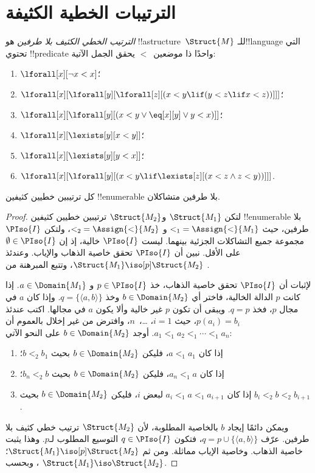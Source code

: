 \documentclass[../../../include/open-logic-section]{subfiles}
\begin{document}
\section{الترتيبات الخطية الكثيفة}

\begin{defn}
  \emph{الترتيب الخطي الكثيف بلا طرفين} هو !!a{structure}~$\Struct{M}$
  للـ!!{language} التي تحتوي !!{predicate} واحدًا ذا موضعين~$<$ يحقق
  الجمل الآتية:
  \begin{enumerate}
  \item $\lforall[x][\lnot x < x]$؛
  \item $\lforall[x][\lforall[y][\lforall[z][(x < y \lif (y < z \lif x
    <z ))]]]$؛
  \item $\lforall[x][\lforall[y][(x< y \lor \eq[x][y] \lor y < x)]]$؛
  \item $\lforall[x][\lexists[y][x < y]]$؛
  \item $\lforall[x][\lexists[y][y < x]]$؛
  \item $\lforall[x][\lforall[y][(x < y \lif \lexists[z][(x < z \land
        z < y))]]]$.
 \end{enumerate}
\end{defn}

\begin{thm}
  كل ترتيبين خطيين كثيفين !!{enumerable} بلا طرفين متشاكلان.
\end{thm}

\begin{proof}
  لتكن $\Struct{M_1}$ و$\Struct{M_2}$ ترتيبين خطيين كثيفين
  !!{enumerable} بلا طرفين، حيث ${<_1} = \Assign{<}{M_1}$ و
  ${<_2} = \Assign{<}{M_2}$، ولتكن $\PIso{I}$ مجموعة جميع التشاكلات
  الجزئية بينهما. ليست $\PIso{I}$ خالية، إذ إن
  $\emptyset \in \PIso{I}$ على الأقل. نبين أن $\PIso{I}$ تحقق خاصية
  الذهاب والإياب. وعندئذ $\Struct{M_1} \iso[p] \Struct{M_2}$، وتتبع
  المبرهنة من .

  لإثبات أن $\PIso{I}$ تحقق خاصية الذهاب، خذ $p \in \PIso{I}$ و
  $a \in \Domain{M_1}$. إذا كانت $p$ الدالة الخالية، فاختر أي
  $b \in \Domain{M_2}$ وخذ $q = \{\langle a,b\rangle\}$. وإذا كان
  $a$ في مجال $p$، فخذ $q=p$. ويبقى أن تكون $p$ غير خالية وألا يكون
  $a$ في مجالها. اكتب عندئذ $p(a_i)=b_i$، حيث $i=1$، \dots،~$n$،
  وافترض من غير إخلال بالعموم أن $a_1 <_1 a_2 <_1 \cdots <_1 a_n$.
  أوجد $b \in \Domain{M_2}$ على النحو الآتي:
  \begin{enumerate}
  \item إذا كان $a <_1 a_1$، فليكن $b \in \Domain{M_2}$ بحيث
    $b <_2 b_1$؛
  \item إذا كان $a_n <_1 a$، فليكن $b \in \Domain{M_2}$ بحيث
    $b_n <_2 b$؛
 \item إذا كان $a_i <_1 a <_1 a_{i+1}$ لبعض $i$، فليكن
   $b \in \Domain{M_2}$ بحيث $b_i <_2 b <_2 b_{i+1}$.
  \end{enumerate}
  ويمكن دائمًا إيجاد $b$ بالخاصية المطلوبة، لأن $\Struct{M_2}$ ترتيب
  خطي كثيف بلا طرفين. عرّف $q = p \cup \{ \langle a, b \rangle \}$،
  فتكون $q \in \PIso{I}$ التوسيع المطلوب لـ$p$. وهذا يثبت خاصية
  الذهاب. وخاصية الإياب مماثلة. ومن ثم
  $\Struct{M_1} \iso[p] \Struct{M_2}$؛ وبحسب
  ، $\Struct{M_1} \iso \Struct{M_2}$.
\end{proof}
\end{document}
